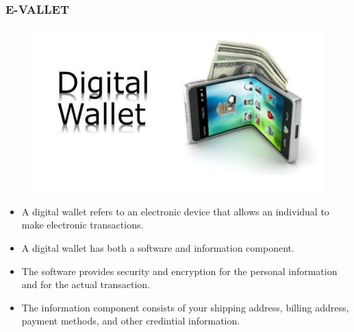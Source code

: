 \documentclass[handout]{beamer}
\begin{document}
\begin{frame}
\frametitle{E-VALLET}
\begin{figure}[h]
\begin{center}
\includegraphics[scale=0.2,angle=360]{vallet1.jpg}
\end{center}
\end{figure}






\begin{itemize}
\item A digital wallet refers to an electronic device that allows an individual to make electronic transactions.
\item A digital wallet has both a software and information component.
\item The software provides security and encryption for the personal information and for the actual transaction.
\item The information component consists of your shipping address, billing address, payment methods, and other credintial information.

\end{itemize}
\end{frame}
\end{document}
